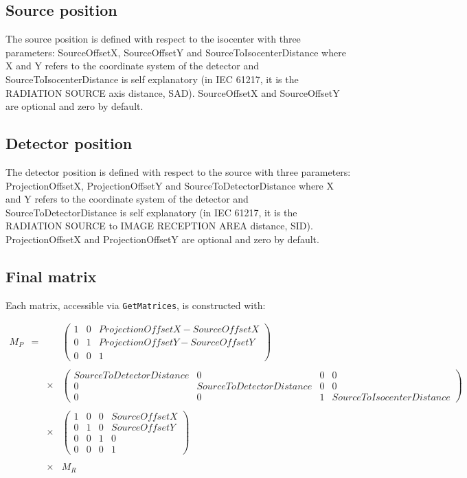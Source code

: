 \documentclass{article}
\begin{document}
\subsection{Source position}

The source position is defined with respect to the isocenter with three parameters: SourceOffsetX, SourceOffsetY and SourceToIsocenterDistance where X and Y refers to the coordinate system of the detector and SourceToIsocenterDistance is self explanatory (in IEC 61217, it is the RADIATION SOURCE axis distance, SAD). SourceOffsetX and SourceOffsetY are optional and zero by default.

\subsection{Detector position}

The detector position is defined with respect to the source with three parameters: ProjectionOffsetX, ProjectionOffsetY and SourceToDetectorDistance where X and Y refers to the coordinate system of the detector and SourceToDetectorDistance is self explanatory (in IEC 61217, it is the RADIATION SOURCE to IMAGE RECEPTION AREA distance, SID). ProjectionOffsetX and ProjectionOffsetY are optional and zero by default.

\subsection{Final matrix}

Each matrix, accessible via \verb+GetMatrices+, is constructed with:

$$
\begin{array}{lcll}
  M_P & = & & %
  \begin{pmatrix}
    1 & 0 & ProjectionOffsetX-SourceOffsetX  \\
    0 & 1 & ProjectionOffsetY-SourceOffsetY  \\
    0 & 0 & 1
  \end{pmatrix} %
  \\ \\ & & \times & %
  \begin{pmatrix}
    SourceToDetectorDistance & 0 & 0 & 0  \\
    0 & SourceToDetectorDistance & 0 & 0  \\
    0 & 0 & 1 & SourceToIsocenterDistance
  \end{pmatrix} %
  \\ \\ & & \times & %
  \begin{pmatrix}
    1 & 0 & 0 & SourceOffsetX  \\
    0 & 1 & 0 & SourceOffsetY  \\
    0 & 0 & 1 & 0 \\
    0 & 0 & 0 & 1
  \end{pmatrix} %
  \\ \\ & & \times & %
  M_R
\end{array}
$$
\end{document}
